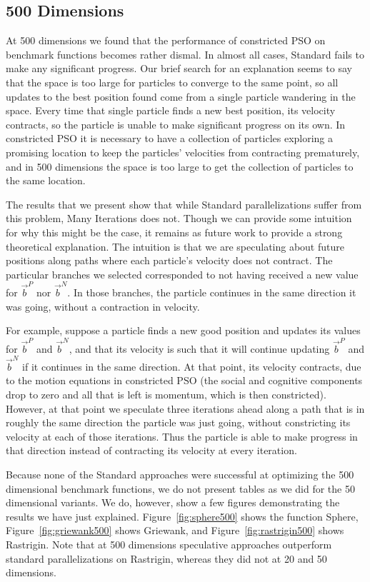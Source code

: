 \documentclass[smallcondensed]{svjour3}
\newcommand{\fig}[1]{Figure~\ref{fig:#1}}
\providecommand{\pers}{\ensuremath{P}}
\providecommand{\neigh}{\ensuremath{N}}
\providecommand{\nbest}{\ensuremath{\Vec{b}^\neigh}}
\providecommand{\pbest}{\ensuremath{\Vec{b}^\pers}}
\begin{document}
\subsection{500 Dimensions}
\label{sec:500dims}

At 500 dimensions we found that the performance of constricted PSO on benchmark
functions becomes rather dismal.  In almost all cases, Standard fails to make
any significant progress.  Our brief search for an explanation seems to say
that the space is too large for particles to converge to the same point, so all
updates to the best position found come from a single particle wandering in the
space.  Every time that single particle finds a new best position, its velocity
contracts, so the particle is unable to make significant progress on its own.
In constricted PSO it is necessary to have a collection of particles exploring
a promising location to keep the particles' velocities from contracting
prematurely, and in 500 dimensions the space is too large to get the collection
of particles to the same location.

The results that we present show that while Standard parallelizations suffer
from this problem, Many Iterations does not.  Though we can provide some
intuition for why this might be the case, it remains as future work to provide
a strong theoretical explanation.  The intuition is that we are speculating
about future positions along paths where each particle's velocity does not
contract.  The particular branches we selected corresponded to not having
received a new value for $\pbest$ nor $\nbest$.  In those branches, the
particle continues in the same direction it was going, without a contraction in
velocity.

For example, suppose a particle finds a new good position and updates its
values for $\pbest$ and $\nbest$, and that its velocity is such that it will
continue updating $\pbest$ and $\nbest$ if it continues in the same direction.
At that point, its velocity contracts, due to the motion equations in
constricted PSO (the social and cognitive components drop to zero and all that
is left is momentum, which is then constricted).  However, at that point we
speculate three iterations ahead along a path that is in roughly the same
direction the particle was just going, without constricting its velocity at
each of those iterations.  Thus the particle is able to make progress in that
direction instead of contracting its velocity at every iteration.

Because none of the Standard approaches were successful at optimizing the 500
dimensional benchmark functions, we do not present tables as we did for the 50
dimensional variants.  We do, however, show a few figures demonstrating the
results we have just explained.  \fig{sphere500} shows the function Sphere,
\fig{griewank500} shows Griewank, and \fig{rastrigin500} shows Rastrigin.  Note
that at 500 dimensions speculative approaches outperform standard
parallelizations on Rastrigin, whereas they did not at 20 and 50 dimensions.
\end{document}
